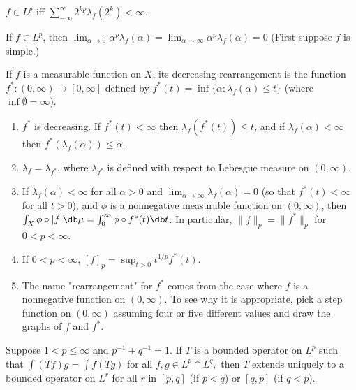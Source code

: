 \documentclass[12pt, a4paper]{article}
\begin{document}
\begin{problem}\label{prob:6-38}
$f\in L^{p}$ iff $\sum_{-\infty}^{\infty}2^{kp}\lambda_{f}(2^{k})<\infty.$
\end{problem}

\begin{problem}\label{prob:6-39}
If $f\in L^{p}$, then $\lim_{\alpha\rightarrow0}\alpha^{p}\lambda_{f}(\alpha)=\lim_{\alpha\rightarrow\infty}\alpha^{p}\lambda_{f}(\alpha)=0$ (First suppose $f$ is simple.)
\end{problem}

\begin{problem}\label{prob:6-40}
If $f$ is a measurable function on $X$, its decreasing rearrangement is the function $f^{*}:(0,\infty)\rightarrow[0,\infty]$ defined by $f^{*}(t)=\inf\{\alpha:\lambda_{f}(\alpha)\le t\}$ (where $\inf\emptyset=\infty$).
\begin{enumerate}[label=\alph*.]
\item $f^{*}$ is decreasing. If $f^{*}(t)<\infty$ then $\lambda_{f}(f^{*}(t))\le t$, and if $\lambda_{f}(\alpha)<\infty$ then $f^{*}(\lambda_{f}(\alpha))\le\alpha$.
\item $\lambda_{f}=\lambda_{f^{*}}$, where $\lambda_{f^{*}}$ is defined with respect to Lebesgue measure on $(0,\infty)$.
\item If $\lambda_{f}(\alpha)<\infty$ for all $\alpha>0$ and $\lim_{\alpha\rightarrow\infty}\lambda_{f}(\alpha)=0$ (so that $f^{*}(t)<\infty$ for all $t>0$), and $\phi$ is a nonnegative measurable function on $(0,\infty)$, then $\int_{X}\phi\circ|f|\db\mu=\int_{0}^{\infty}\phi\circ f^{*}(t)\db t$. In particular, $\|f\|_{p}=\|f^{*}\|_{p}$ for $0<p<\infty$.
\item If $0<p<\infty$, $[f]_{p}=\sup_{t>0}t^{1/p}f^{*}(t)$.
\item The name "rearrangement" for $f^{*}$ comes from the case where $f$ is a nonnegative function on $(0,\infty)$. To see why it is appropriate, pick a step function on $(0,\infty)$ assuming four or five different values and draw the graphs of $f$ and $f^{*}$.
\end{enumerate}
\end{problem}

\begin{problem}\label{prob:6-41}
Suppose $1<p\le\infty$ and $p^{-1}+q^{-1}=1$. If $T$ is a bounded operator on $L^{p}$ such that $\int(Tf)g=\int f(Tg)$ for all $f,g\in L^{p}\cap L^{q},$ then $T$ extends uniquely to a bounded operator on $L^{r}$ for all $r$ in $[p,q]$ (if $p<q$) or $[q,p]$ (if $q<p$).
\end{problem}
\end{document}
